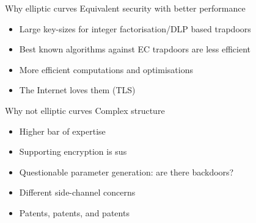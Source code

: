 \iffalse
\begin{frame}{Elliptic curve cryptography}
  \begin{tikzpicture}
    \begin{axis}[
            xmin=-4,
            xmax=5,
            ymin=-5,
            ymax=5,
            xlabel={$x$},
            ylabel={$y$},
            scale only axis,
            axis lines=middle,
            domain=-2.279018:3,      
            samples=201,
            smooth,   
            clip=false,
            axis equal image=true,
        ]
    
    \addplot[blue] {sqrt(x^3-3*x+5)} node[right] {$E$};
    \addplot[blue] {-sqrt(x^3-3*x+5)};
    \addplot[red] {2.621+0.251*(x+1.2)};
    
    
        \draw [fill=black] (axis cs:-1.2,2.6) circle (2pt);
        \draw[color=black] (axis cs:-1.4,2.7) node [left]{$P$};
    \end{axis}
    \end{tikzpicture}
\end{frame}
\fi

\begin{frame}{Why elliptic curves}
  Equivalent security with better performance
  \begin{itemize}[<+(1)->]
    \item Large key-sizes for integer factorisation/DLP based trapdoors
    \item Best known algorithms against EC trapdoors are less efficient
    \item More efficient computations and optimisations
    \item The Internet loves them (TLS)
  \end{itemize}
\end{frame}

\begin{frame}{Why not elliptic curves}
  Complex structure
  \begin{itemize}
    \item Higher bar of expertise
    \item Supporting encryption is sus
    \item Questionable parameter generation: are there backdoors?
    \item Different side-channel concerns
    \item Patents, patents, and patents
  \end{itemize}
\end{frame}

